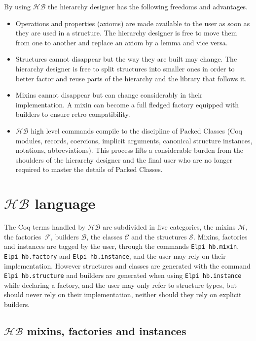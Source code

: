 \documentclass[a4paper,UKenglish,cleveref, autoref]{lipics-v2019}
\newcommand{\HB}{\ensuremath{\mathcal{HB}}}
\newcommand{\mixin}{mixin}
\newcommand{\mixins}{mixins}
\newcommand{\Mixins}{Mixins}
\newcommand{\M}{\ensuremath{\mathcal{M}}}
\newcommand{\factory}{factory}
\newcommand{\factories}{factories}
\newcommand{\phantterms}{abbreviations}
\newcommand{\builder}{builder}
\newcommand{\mixinbuilders}{builders}
\newcommand{\F}{\ensuremath{\mathcal{F}}}
\newcommand{\C}{\ensuremath{\mathcal{C}}}
\newcommand{\B}{\ensuremath{\mathcal{B}}}
\newcommand{\classes}{classes}
\newcommand{\Str}{\ensuremath{\mathcal{S}}}
\newcommand{\structures}{structures}
\newcommand{\hbmixin}{{\tt\color{dkgreen}Elpi hb.mixin}}
\newcommand{\hbfactory}{{\tt\color{dkgreen}Elpi hb.factory}}
\newcommand{\hbinstance}{{\tt\color{dkgreen}Elpi hb.instance}}
\newcommand{\hbstructure}{{\tt\color{dkgreen}Elpi hb.structure}}
\theoremstyle{implem}
\theoremstyle{implem}
\theoremstyle{command}
\begin{document}
By using \HB{} the hierarchy designer has the following freedoms and advantages.

\begin{itemize}
\item Operations and properties (axioms) are made available to the user
      as soon as they are used in a structure. The hierarchy designer
      is free to move them from one to another and replace an axiom
      by a lemma and vice versa.
\item Structures cannot disappear but the way they are built may change.
      The hierarchy designer is free to split structures into smaller
      ones in order to better factor and reuse parts of the hierarchy
      and the library that follows it.
\item \Mixins{} cannot disappear but can change considerably
      in their implementation. A \mixin{} can become a full fledged
      \factory{} equipped with \builder{}s to ensure retro compatibility.
\item \HB{} high level commands compile to
      the discipline of Packed Classes (Coq modules, records, coercions,
      implicit arguments, canonical structure instances, notations,
      \phantterms{}).
      This process lifts a considerable
      burden from the shoulders of the hierarchy designer and the final user
      who are no longer required to master the details of Packed Classes.
\end{itemize}

\section{\HB{} language}\label{sec:language}

The Coq terms handled by \HB{} are subdivided in five categories, the
\mixins{} \(\M{}\), the \factories{}~\(\F{}\), \mixinbuilders{}
\(\B{}\), the \classes{} \(\C{}\) and the \structures{}
\(\Str{}\). \Mixins{}, \factories{} and instances are tagged by the
user, through the commands \hbmixin{}, \hbfactory{} and \hbinstance{},
and the user may rely on their implementation. However structures and
classes are generated with the command \hbstructure{} and builders are
generated when using \hbinstance{} while declaring a \factory{}, and
the user may only refer to structure types, but should never rely on
their implementation, neither should they rely on explicit builders.

\subsection{\HB{} \mixins{}, \factories{} and instances}
\label{sec:hb-mixins-factories}
\end{document}
